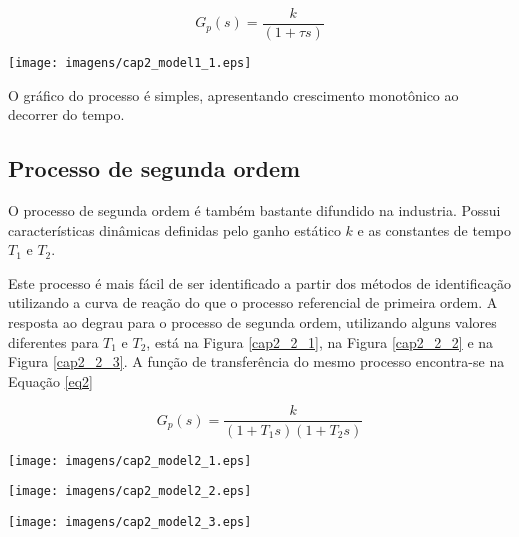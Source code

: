     \begin{equation}
        \label{eq1}
        G_p(s) = \frac{k}{(1+\tau s)}
    \end{equation}
    
    \begin{center}
        \texttt{[image: imagens/cap2\_model1\_1.eps]}
    \label{cap2_1}
    \end{center}

    O gráfico do processo é simples, apresentando crescimento monotônico ao
    decorrer do tempo.

\subsection{Processo de segunda ordem}
    
    O processo de segunda ordem é também bastante difundido na industria. Possui
    características dinâmicas definidas pelo ganho estático $k$ e as constantes de
    tempo $T_1$ e $T_2$.
    
    Este processo é mais fácil de ser identificado a partir dos métodos de
    identificação utilizando a curva de reação do que o processo referencial de
    primeira ordem. A resposta ao degrau para o processo de segunda ordem, utilizando
    alguns valores diferentes para $T_1$ e $T_2$, está na Figura \ref{cap2_2_1}, na Figura
    \ref{cap2_2_2} e na Figura \ref{cap2_2_3}. A função de transferência do mesmo
    processo encontra-se na Equação \ref{eq2}
    
    \begin{equation}
        \label{eq2}
        G_p(s) = \frac{k}{(1+T_1 s)(1+T_2 s)}
    \end{equation}
    
    \begin{center}
        \texttt{[image: imagens/cap2\_model2\_1.eps]}
        \label{cap2_2_1}
    \end{center}

    \begin{center}
        \texttt{[image: imagens/cap2\_model2\_2.eps]}
        \label{cap2_2_2}
    \end{center}
    
    \begin{center}
        \texttt{[image: imagens/cap2\_model2\_3.eps]}
        \label{cap2_2_3}
    \end{center}

